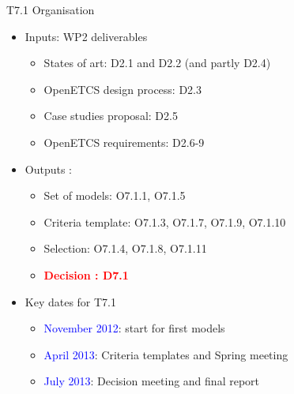 \begin{frame}{T7.1 Organisation}

  \begin{itemize}
  \item
    Inputs: WP2 deliverables
      \begin{itemize}
	  \item
 	   States of art: D2.1 and D2.2 (and partly D2.4)
 	  \item
 	   OpenETCS design process: D2.3
 	  \item
 	   Case studies proposal: D2.5
 	  \item 
 	   OpenETCS requirements:  D2.6-9
	  \end{itemize}
	  \pause
    \item
    Outputs :
      \begin{itemize}
      \item
      	Set of models: O7.1.1, O7.1.5
	  \item
	    Criteria template: O7.1.3, O7.1.7, O7.1.9, O7.1.10
	  \item
	    Selection: O7.1.4, O7.1.8, O7.1.11
	  \item
	  	\textcolor{red}{\textbf{Decision : D7.1}}
  \end{itemize}
  \pause
  	\item
  		Key dates for T7.1
  	 \begin{itemize}
	  \item
 	   \textcolor{blue}{November 2012}: start for first models
 	  \item
 	   \textcolor{blue}{April 2013}: Criteria templates and Spring meeting
 	  \item
 	   \textcolor{blue}{July 2013}: Decision meeting and final report
	  \end{itemize}	
  
  \end{itemize}

\end{frame}


